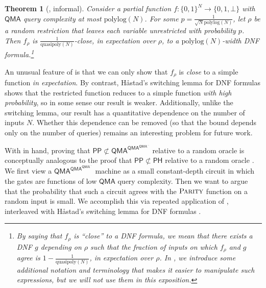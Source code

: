 \documentclass[10pt,a4paper]{article}
\newtheorem{theorem}{Theorem}
\newcommand{\polylog}{\mathrm{polylog}}
\newcommand{\quasipoly}{\mathrm{quasipoly}}
\newcommand{\PARITY}{\normalfont\textsc{Parity}}
\begin{document}
\begin{theorem}[, informal]
\label{thm:qma_random_restriction_intro}
Consider a partial function $f: \{0,1\}^N \to \{0,1,\bot\}$ with $\mathsf{QMA}$ query complexity at most $\polylog(N)$. For some $p = \frac{1}{\sqrt{N}\polylog(N)}$, let $\rho$ be a random restriction that leaves each variable unrestricted with probability $p$. Then $f_\rho$ is $\frac{1}{\quasipoly(N)}$-close, in expectation over $\rho$, to a $\polylog(N)$-width DNF formula.\footnote{By saying that $f_\rho$ is ``close'' to a DNF formula, we mean that there exists a DNF $g$ depending on $\rho$ such that the fraction of inputs on which $f_\rho$ and $g$ agree is $1 - \frac{1}{\quasipoly(N)}$, in expectation over $\rho$. In , we introduce some additional notation and terminology that makes it easier to manipulate such expressions, but we will not use them in this exposition.}
\end{theorem}

An unusual feature of  is that we can only show that $f_\rho$ is \textit{close} to a simple function \textit{in expectation}. By contrast, H\r{a}stad's switching lemma for DNF formulas \cite{Has87} shows that the restricted function reduces to a simple function \textit{with high probability}, so in some sense our result is weaker. Additionally, unlike the switching lemma, our result has a quantitative dependence on the number of inputs $N$. Whether this dependence can be removed (so that the bound depends only on the number of queries) remains an interesting problem for future work.

With  in hand, proving that $\mathsf{PP} \not\subset \mathsf{QMA}^{\mathsf{QMA}^{\mathsf{QMA}^{\cdots}}}$ relative to a random oracle is conceptually analogous to the proof that $\mathsf{PP} \not\subset \mathsf{PH}$ relative to a random oracle \cite{Has87}. We first view a $\mathsf{QMA}^{\mathsf{QMA}^{\mathsf{QMA}^{\cdots}}}$ machine as a small constant-depth circuit in which the gates are functions of low $\mathsf{QMA}$ query complexity. Then we want to argue that the probability that such a circuit agrees with the $\PARITY$ function on a random input is small. We accomplish this via repeated application of , interleaved with H\r{a}stad's switching lemma for DNF formulas \cite{Has87}.
\end{document}

